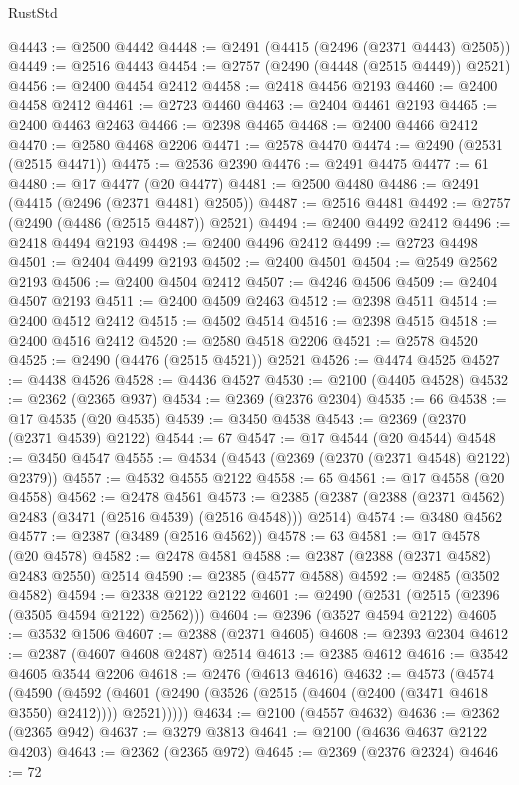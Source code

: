 \begin{lexlean}{RustStd}
\begin{coremodule}
@4443 := @2500 @4442
@4448 := @2491 (@4415 (@2496 (@2371 @4443) @2505))
@4449 := @2516 @4443
@4454 := @2757 (@2490 (@4448 (@2515 @4449)) @2521)
@4456 := @2400 @4454 @2412
@4458 := @2418 @4456 @2193
@4460 := @2400 @4458 @2412
@4461 := @2723 @4460
@4463 := @2404 @4461 @2193
@4465 := @2400 @4463 @2463
@4466 := @2398 @4465
@4468 := @2400 @4466 @2412
@4470 := @2580 @4468 @2206
@4471 := @2578 @4470
@4474 := @2490 (@2531 (@2515 @4471))
@4475 := @2536 @2390
@4476 := @2491 @4475
@4477 := 61
@4480 := @17 @4477 (@20 @4477)
@4481 := @2500 @4480
@4486 := @2491 (@4415 (@2496 (@2371 @4481) @2505))
@4487 := @2516 @4481
@4492 := @2757 (@2490 (@4486 (@2515 @4487)) @2521)
@4494 := @2400 @4492 @2412
@4496 := @2418 @4494 @2193
@4498 := @2400 @4496 @2412
@4499 := @2723 @4498
@4501 := @2404 @4499 @2193
@4502 := @2400 @4501
@4504 := @2549 @2562 @2193
@4506 := @2400 @4504 @2412
@4507 := @4246 @4506
@4509 := @2404 @4507 @2193
@4511 := @2400 @4509 @2463
@4512 := @2398 @4511
@4514 := @2400 @4512 @2412
@4515 := @4502 @4514
@4516 := @2398 @4515
@4518 := @2400 @4516 @2412
@4520 := @2580 @4518 @2206
@4521 := @2578 @4520
@4525 := @2490 (@4476 (@2515 @4521)) @2521
@4526 := @4474 @4525
@4527 := @4438 @4526
@4528 := @4436 @4527
@4530 := @2100 (@4405 @4528)
@4532 := @2362 (@2365 @937)
@4534 := @2369 (@2376 @2304)
@4535 := 66
@4538 := @17 @4535 (@20 @4535)
@4539 := @3450 @4538
@4543 := @2369 (@2370 (@2371 @4539) @2122)
@4544 := 67
@4547 := @17 @4544 (@20 @4544)
@4548 := @3450 @4547
@4555 := @4534 (@4543 (@2369 (@2370 (@2371 @4548) @2122) @2379))
@4557 := @4532 @4555 @2122
@4558 := 65
@4561 := @17 @4558 (@20 @4558)
@4562 := @2478 @4561
@4573 := @2385 (@2387 (@2388 (@2371 @4562) @2483 (@3471 (@2516 @4539) (@2516 @4548))) @2514)
@4574 := @3480 @4562
@4577 := @2387 (@3489 (@2516 @4562))
@4578 := 63
@4581 := @17 @4578 (@20 @4578)
@4582 := @2478 @4581
@4588 := @2387 (@2388 (@2371 @4582) @2483 @2550) @2514
@4590 := @2385 (@4577 @4588)
@4592 := @2485 (@3502 @4582)
@4594 := @2338 @2122 @2122
@4601 := @2490 (@2531 (@2515 (@2396 (@3505 @4594 @2122) @2562)))
@4604 := @2396 (@3527 @4594 @2122)
@4605 := @3532 @1506
@4607 := @2388 (@2371 @4605)
@4608 := @2393 @2304
@4612 := @2387 (@4607 @4608 @2487) @2514
@4613 := @2385 @4612
@4616 := @3542 @4605 @3544 @2206
@4618 := @2476 (@4613 @4616)
@4632 := @4573
    (@4574
      (@4590
        (@4592 (@4601 (@2490 (@3526 (@2515 (@4604 (@2400 (@3471 @4618 @3550) @2412)))) @2521)))))
@4634 := @2100 (@4557 @4632)
@4636 := @2362 (@2365 @942)
@4637 := @3279 @3813
@4641 := @2100 (@4636 @4637 @2122 @4203)
@4643 := @2362 (@2365 @972)
@4645 := @2369 (@2376 @2324)
@4646 := 72

\end{coremodule}
\end{lexlean}
